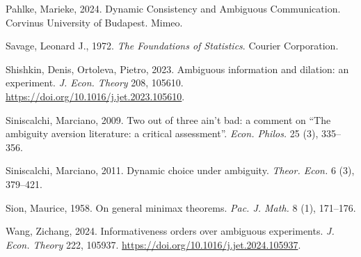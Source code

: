 \documentclass[12pt,a4paper]{article}
\theoremstyle{definition}
\theoremstyle{remark}
\newenvironment{original}{%
    \par\medskip\noindent%
    \begin{tcolorbox}[%
        colback=white,%
        colframe=black!50,%
        title=\textbf{Original English},%
        fonttitle=\small\bfseries,%
        left=0pt, right=0pt, top=2pt, bottom=2pt,%
        boxrule=0.5pt,%
        arc=0pt,%
        outer arc=0pt%
    ]%
    \small%
}{%
    \end{tcolorbox}%
}
\begin{document}
\begin{original}
\noindent Pahlke, Marieke, 2024. Dynamic Consistency and Ambiguous Communication. Corvinus University of Budapest. Mimeo.

\noindent Savage, Leonard J., 1972. \textit{The Foundations of Statistics}. Courier Corporation.

\noindent Shishkin, Denis, Ortoleva, Pietro, 2023. Ambiguous information and dilation: an experiment. \textit{J. Econ. Theory} 208, 105610. \url{https://doi.org/10.1016/j.jet.2023.105610}.

\noindent Siniscalchi, Marciano, 2009. Two out of three ain't bad: a comment on ``The ambiguity aversion literature: a critical assessment''. \textit{Econ. Philos.} 25 (3), 335--356.

\noindent Siniscalchi, Marciano, 2011. Dynamic choice under ambiguity. \textit{Theor. Econ.} 6 (3), 379--421.

\noindent Sion, Maurice, 1958. On general minimax theorems. \textit{Pac. J. Math.} 8 (1), 171--176.

\noindent Wang, Zichang, 2024. Informativeness orders over ambiguous experiments. \textit{J. Econ. Theory} 222, 105937. \url{https://doi.org/10.1016/j.jet.2024.105937}.
\end{original}
\end{document}
